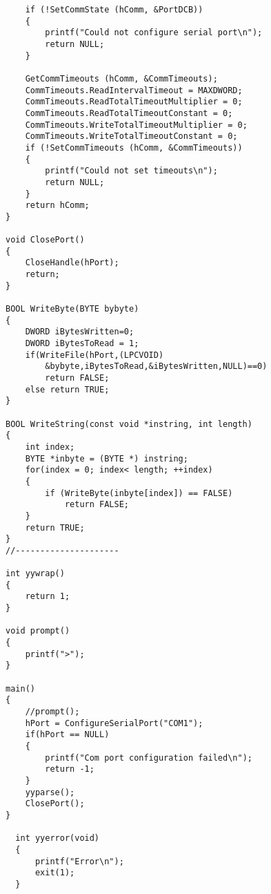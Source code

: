 \begin{lstlisting}
    if (!SetCommState (hComm, &PortDCB))
    {
        printf("Could not configure serial port\n");
        return NULL;
    }

    GetCommTimeouts (hComm, &CommTimeouts);
    CommTimeouts.ReadIntervalTimeout = MAXDWORD;
    CommTimeouts.ReadTotalTimeoutMultiplier = 0;
    CommTimeouts.ReadTotalTimeoutConstant = 0;
    CommTimeouts.WriteTotalTimeoutMultiplier = 0;
    CommTimeouts.WriteTotalTimeoutConstant = 0;
    if (!SetCommTimeouts (hComm, &CommTimeouts))
    {
        printf("Could not set timeouts\n");
        return NULL;
    }
    return hComm;
}

void ClosePort()
{
    CloseHandle(hPort);
    return;
}

BOOL WriteByte(BYTE bybyte)
{
    DWORD iBytesWritten=0;
    DWORD iBytesToRead = 1;
    if(WriteFile(hPort,(LPCVOID) 
        &bybyte,iBytesToRead,&iBytesWritten,NULL)==0)
        return FALSE;
    else return TRUE;
}

BOOL WriteString(const void *instring, int length)
{
    int index;
    BYTE *inbyte = (BYTE *) instring;
    for(index = 0; index< length; ++index)
    {
        if (WriteByte(inbyte[index]) == FALSE)
            return FALSE;
    }
    return TRUE;
}
//---------------------

int yywrap()
{
	return 1;
}

void prompt()
{
	printf(">");
}

main()
{
	//prompt();
    hPort = ConfigureSerialPort("COM1");
    if(hPort == NULL)
    {
        printf("Com port configuration failed\n");
        return -1;
    }
	yyparse();
	ClosePort();
}

  int yyerror(void)
  {
      printf("Error\n");
      exit(1);
  }


\end{lstlisting}
